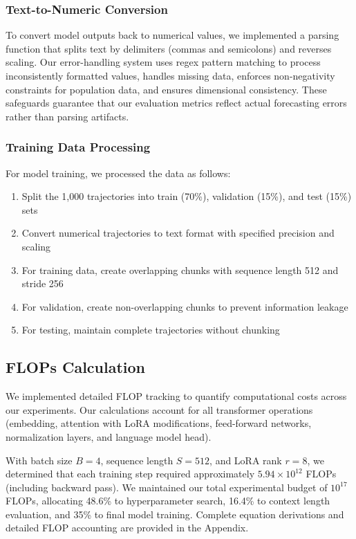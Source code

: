 \documentclass{article}
\begin{document}
\subsubsection*{Text-to-Numeric Conversion}

To convert model outputs back to numerical values, we implemented a parsing function that splits text by delimiters (commas and semicolons) and reverses scaling. Our error-handling system uses regex pattern matching to process inconsistently formatted values, handles missing data, enforces non-negativity constraints for population data, and ensures dimensional consistency. These safeguards guarantee that our evaluation metrics reflect actual forecasting errors rather than parsing artifacts.
\subsubsection*{Training Data Processing}

For model training, we processed the data as follows:
\begin{enumerate}
    \item Split the 1,000 trajectories into train (70\%), validation (15\%), and test (15\%) sets
    \item Convert numerical trajectories to text format with specified precision and scaling
    \item For training data, create overlapping chunks with sequence length 512 and stride 256
    \item For validation, create non-overlapping chunks to prevent information leakage
    \item For testing, maintain complete trajectories without chunking
\end{enumerate}

\subsection*{FLOPs Calculation}

We implemented detailed FLOP tracking to quantify computational costs across our experiments. Our calculations account for all transformer operations (embedding, attention with LoRA modifications, feed-forward networks, normalization layers, and language model head). 

With batch size $B=4$, sequence length $S=512$, and LoRA rank $r=8$, we determined that each training step required approximately $5.94 \times 10^{12}$ FLOPs (including backward pass). We maintained our total experimental budget of $10^{17}$ FLOPs, allocating 48.6\% to hyperparameter search, 16.4\% to context length evaluation, and 35\% to final model training. Complete equation derivations and detailed FLOP accounting are provided in the Appendix.
\end{document}
